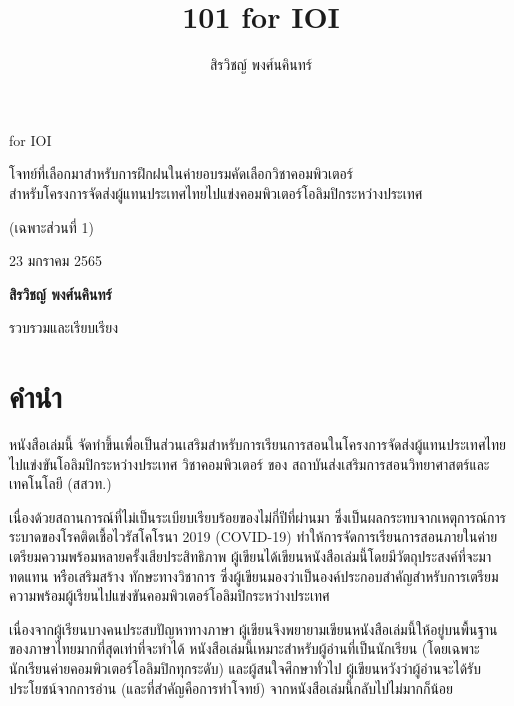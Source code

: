 \documentclass[12pt]{octavo}
\title{101 for IOI}
\author{สิรวิชญ์ พงศ์นคินทร์}
\date{}
\begin{document}
\thispagestyle{titlepage}

\vspace*{\fill}

\begin{center}
{
    \noindent\sffamily
    {\Huge{} for IOI}
    
    \medskip
    
    โจทย์ที่เลือกมาสำหรับการฝึกฝนในค่ายอบรมคัดเลือกวิชาคอมพิวเตอร์\\
    สำหรับโครงการจัดส่งผู้แทนประเทศไทยไปแข่งคอมพิวเตอร์โอลิมปิกระหว่างประเทศ
    
    \bigskip
    
    (เฉพาะส่วนที่ 1)
    
    \vspace{2cm}
    
    23 มกราคม 2565
    
    \vspace{3cm}
    
    \textbf{สิรวิชญ์ พงศ์นคินทร์}
    
    รวบรวมและเรียบเรียง
}
\end{center}

\vspace*{\fill}

\newpage

\chapter*{คำนำ}

หนังสือเล่มนี้ จัดทำขึ้นเพื่อเป็นส่วนเสริมสำหรับการเรียนการสอนในโครงการจัดส่งผู้แทนประเทศไทยไปแข่งขันโอลิมปิกระหว่างประเทศ วิชาคอมพิวเตอร์ ของ สถาบันส่งเสริมการสอนวิทยาศาสตร์และเทคโนโลยี (สสวท.)

เนื่องด้วยสถานการณ์ที่ไม่เป็นระเบียบเรียบร้อยของไม่กี่ปีที่ผ่านมา ซึ่งเป็นผลกระทบจากเหตุการณ์การระบาดของโรคติดเชื้อไวรัสโคโรนา 2019 (COVID-19) ทำให้การจัดการเรียนการสอนภายในค่ายเตรียมความพร้อมหลายครั้งเสียประสิทธิภาพ ผู้เขียนได้เขียนหนังสือเล่มนี้โดยมีวัตถุประสงค์ที่จะมาทดแทน หรือเสริมสร้าง ทักษะทางวิชาการ ซึ่งผู้เขียนมองว่าเป็นองค์ประกอบสำคัญสำหรับการเตรียมความพร้อมผู้เรียนไปแข่งขันคอมพิวเตอร์โอลิมปิกระหว่างประเทศ

เนื่องจากผู้เรียนบางคนประสบปัญหาทางภาษา ผู้เขียนจึงพยายามเขียนหนังสือเล่มนี้ให้อยู่บนพื้นฐานของภาษาไทยมากที่สุดเท่าที่จะทำได้ หนังสือเล่มนี้เหมาะสำหรับผู้อ่านที่เป็นนักเรียน (โดยเฉพาะนักเรียนค่ายคอมพิวเตอร์โอลิมปิกทุกระดับ) และผู้สนใจศึกษาทั่วไป ผู้เขียนหวังว่าผู้อ่านจะได้รับประโยชน์จากการอ่าน (และที่สำคัญคือการทำโจทย์) จากหนังสือเล่มนี้กลับไปไม่มากก็น้อย
\end{document}
